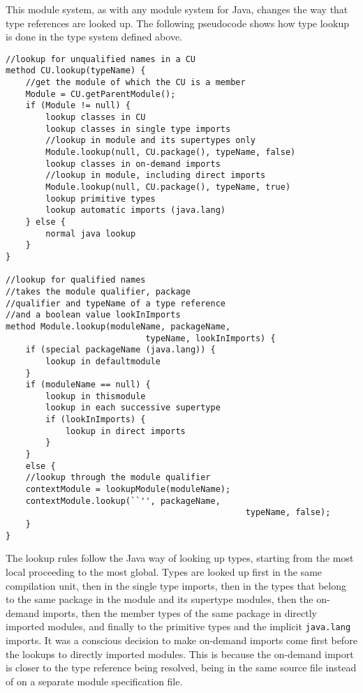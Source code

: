 
This module system, as with any module system for Java, changes the way that type
references are looked up. The following pseudocode shows how type lookup is done in
the type system defined above. 

\begin{lstlisting}[caption = Type Lookup, tabsize=2, morekeywords={method}]
//lookup for unqualified names in a CU
method CU.lookup(typeName) {
	//get the module of which the CU is a member
	Module = CU.getParentModule();
	if (Module != null) {
		lookup classes in CU
		lookup classes in single type imports
		//lookup in module and its supertypes only
		Module.lookup(null, CU.package(), typeName, false)
		lookup classes in on-demand imports
		//lookup in module, including direct imports
		Module.lookup(null, CU.package(), typeName, true)
		lookup primitive types
		lookup automatic imports (java.lang)
	} else {
		normal java lookup
	}
}

//lookup for qualified names
//takes the module qualifier, package
//qualifier and typeName of a type reference
//and a boolean value lookInImports
method Module.lookup(moduleName, packageName, 
							typeName, lookInImports) {
	if (special packageName (java.lang)) {
		lookup in defaultmodule
	}
	if (moduleName == null) {
		lookup in thismodule
		lookup in each successive supertype
		if (lookInImports) {
			lookup in direct imports
		}
	} 
	else {
	//lookup through the module qualifier
	contextModule = lookupModule(moduleName);
	contextModule.lookup(``'', packageName, 
												typeName, false);
	}
}
\end{lstlisting}

The lookup rules follow the Java way of looking up types,
starting from the most local proceeding to the most global. Types are looked up
first in the same compilation unit, then in the single type imports,
then in the types that belong to the same package in the module and its supertype 
modules, then the on-demand imports, then the member types of the same package
in directly imported modules, and finally to the primitive types and the 
implicit {\tt java.lang} imports. It was a conscious decision to make on-demand imports
come first before the lookups to directly imported modules. This is because the on-demand import
is closer to the type reference being resolved, being in the same source file instead of
on a separate module specification file.
